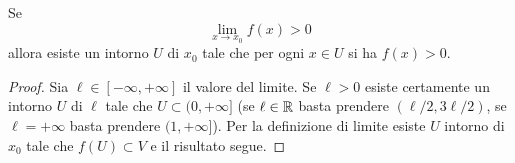\begin{theorem}%
\mymark{***}%
%
%
%
Se
\[
  \lim_{x\to x_0} f(x) > 0
\]
allora esiste un intorno $U$ di $x_0$ tale che 
per ogni $x\in U$ si ha $f(x) > 0$.
\end{theorem}
%
\begin{proof}
Sia $\ell\in [-\infty,+\infty]$ il valore del limite.
Se $\ell>0$ esiste certamente un intorno $U$ di $\ell$ 
tale che $U\subset (0,+\infty]$ (se $\ell\in \mathbb R$ basta prendere 
$(\ell/2,3 \ell/2)$, se $\ell=+\infty$ basta prendere $(1,+\infty]$).
Per la definizione di limite esiste $U$ intorno di $x_0$ 
tale che $f(U)\subset V$ e il risultato segue.
\end{proof}

